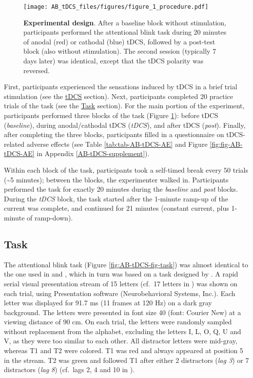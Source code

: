 \documentclass[11pt,]{memoir}
\begin{document}
\begin{figure}
\centering
\texttt{[image: AB\_tDCS\_files/figures/figure\_1\_procedure.pdf]}
\caption{\label{fig:AB-tDCS-fig-procedure}\textbf{Experimental design}. After a baseline block without stimulation, participants performed the attentional blink task during 20 minutes of anodal (red) or cathodal (blue) tDCS, followed by a post-test block (also without stimulation). The second session (typically 7 days later) was identical, except that the tDCS polarity was reversed.}
\end{figure}

First, participants experienced the sensations induced by tDCS in a brief trial stimulation (see the \protect\hyperlink{AB_tDCS-tDCS}{tDCS} section). Next, participants completed 20 practice trials of the task (see the \protect\hyperlink{AB_tDCS-task}{Task} section). For the main portion of the experiment, participants performed three blocks of the task (Figure \ref{fig:AB-tDCS-fig-procedure}): before tDCS (\emph{baseline}), during anodal/cathodal tDCS (\emph{tDCS}), and after tDCS (\emph{post}). Finally, after completing the three blocks, participants filled in a questionnaire on tDCS-related adverse effects (see Table \ref{tab:tab-AB-tDCS-AE} and Figure \ref{fig:fig-AB-tDCS-AE} in Appendix \ref{AB-tDCS-supplement}).

Within each block of the task, participants took a self-timed break every 50 trials (\textasciitilde{}5 minutes); between the blocks, the experimenter walked in. Participants performed the task for exactly 20 minutes during the \emph{baseline} and \emph{post} blocks. During the \emph{tDCS} block, the task started after the 1-minute ramp-up of the current was complete, and continued for 21 minutes (constant current, plus 1-minute of ramp-down).



\hypertarget{AB_tDCS-task}{%
\subsection{Task}\label{AB_tDCS-task}}

The attentional blink task (Figure \ref{fig:AB-tDCS-fig-task}) was almost identical to the one used in \textcite{London2015} and \textcite{Slagter2013}, which in turn was based on a task designed by \textcite{Dux2008}. A rapid serial visual presentation stream of 15 letters (cf.~17 letters in \textcite{London2015}) was shown on each trial, using Presentation software (Neurobehavioral Systems, Inc.). Each letter was displayed for 91.7 ms (11 frames at 120 Hz) on a dark gray background. The letters were presented in font size 40 (font: Courier New) at a viewing distance of 90 cm. On each trial, the letters were randomly sampled without replacement from the alphabet, excluding the letters I, L, O, Q, U and V, as they were too similar to each other. All distractor letters were mid-gray, whereas T1 and T2 were colored. T1 was red and always appeared at position 5 in the stream. T2 was green and followed T1 after either 2 distractors (\emph{lag 3}) or 7 distractors (\emph{lag 8}) (cf.~lags 2, 4 and 10 in \textcite{London2015}).
\end{document}
